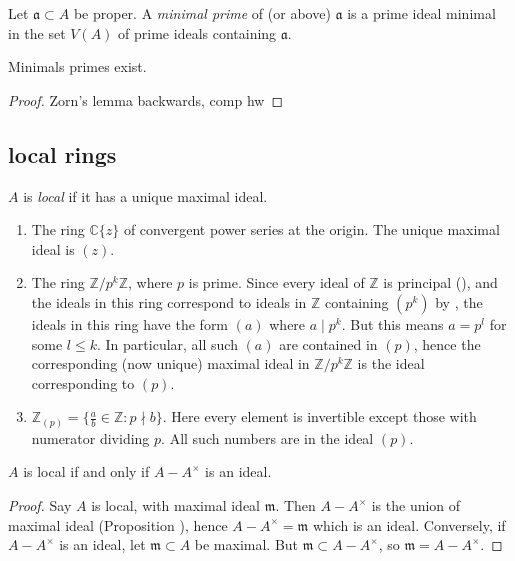 \documentclass[12pt]{article}
\begin{document}
\begin{definition}
	Let $\mathfrak{a}\subset A$ be proper. A \emph{minimal prime} of (or above) $\mathfrak{a}$ is a prime ideal minimal in the set $V(A)$ of prime ideals containing $\mathfrak{a}$. 
\end{definition}

\begin{proposition}
	Minimals primes exist.
\end{proposition}
\begin{proof}
	Zorn's lemma backwards, comp hw 
\end{proof}


\subsection{local rings} %

\begin{definition}
	$A$ is \emph{local} if it has a unique maximal ideal.
\end{definition}

\begin{example}
	\hfill
	\begin{enumerate}
		\item The ring $\mathbb{C}\{z\}$ of convergent power series at the origin. The unique maximal ideal is $(z)$. 
		\item The ring $\mathbb{Z}/p^k\mathbb{Z}$, where $p$ is prime. Since every ideal of $\mathbb{Z}$ is principal (), and the ideals in this ring correspond to ideals in $\mathbb{Z}$ containing $(p^k)$ by , the ideals in this ring have the form $(a)$ where $a\mid p^k$. But this means $a=p^l$ for some $l\leq k$. In particular, all such $(a)$ are contained in $(p)$, hence the corresponding (now unique) maximal ideal in $\mathbb{Z}/p^k\mathbb{Z}$ is the ideal corresponding to $(p)$.
		\item $\mathbb{Z}_{(p)} = \{\frac{a}{b}\in\mathbb{Z} : p\nmid b \}$. Here every element is invertible except those with numerator dividing $p$. All such numbers are in the ideal $(p)$. 
	\end{enumerate}
\end{example}

\begin{proposition}
	$A$ is local if and only if $A-A^\times$ is an ideal.
\end{proposition} 
\begin{proof}
	Say $A$ is local, with maximal ideal $\mathfrak{m}$. Then $A-A^\times$ is the union of maximal ideal (Proposition ), hence $A-A^\times=\mathfrak{m}$ which is an ideal. Conversely, if $A-A^\times$ is an ideal, let $\mathfrak{m}\subset A$ be maximal. But $\mathfrak{m}\subset A-A^\times$, so $\mathfrak{m}=A-A^\times$.
\end{proof}
\end{document}
